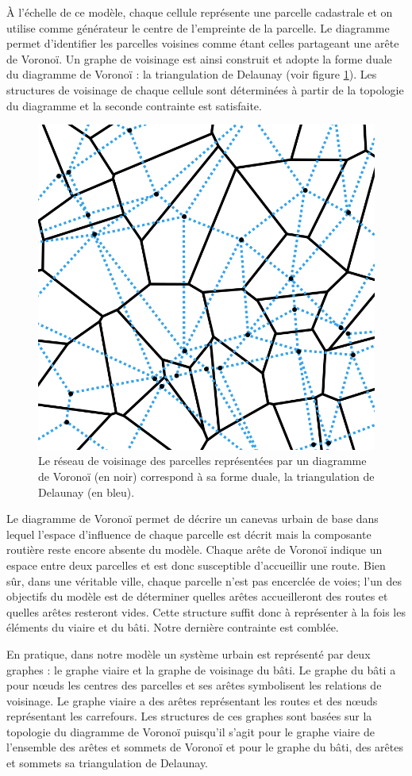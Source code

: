 \documentclass[10pt]{article}
\begin{document}
À l'échelle de ce modèle, chaque cellule représente une parcelle
cadastrale et on utilise comme générateur le centre de l'empreinte de
la parcelle. Le diagramme permet d'identifier les parcelles voisines
comme étant celles partageant une arête de Voronoï. Un graphe de
voisinage est ainsi construit et adopte la forme duale du diagramme de
Voronoï : la triangulation de Delaunay (voir figure
\ref{fig:delaunay}). Les structures de voisinage de chaque cellule
sont déterminées à partir de la topologie du diagramme et la seconde
contrainte est satisfaite.

\begin{figure}[!ht]
  \centering
  \includegraphics[width=.7\linewidth]{images/delaunay.png}
  \caption{Le réseau de voisinage des parcelles représentées par un
    diagramme de Voronoï (en noir) correspond à sa forme duale, la
    triangulation de Delaunay (en bleu).}
  \label{fig:delaunay}
\end{figure}

Le diagramme de Voronoï permet de décrire un canevas urbain de base
dans lequel l'espace d'influence de chaque parcelle est décrit mais la
composante routière reste encore absente du modèle. Chaque arête de
Voronoï indique un espace entre deux parcelles et est donc susceptible
d'accueillir une route. Bien sûr, dans une véritable ville, chaque
parcelle n'est pas encerclée de voies; l'un des objectifs du modèle
est de déterminer quelles arêtes accueilleront des routes et quelles
arêtes resteront vides. Cette structure suffit donc à représenter à la
fois les éléments du viaire et du bâti. Notre dernière contrainte est
comblée.

En pratique, dans notre modèle un système urbain est représenté par
deux graphes : le graphe viaire et la graphe de voisinage du bâti. Le
graphe du bâti a pour n\oe uds les centres des parcelles et ses arêtes
symbolisent les relations de voisinage. Le graphe viaire a des arêtes
représentant les routes et des n\oe uds représentant les
carrefours. Les structures de ces graphes sont basées sur la topologie
du diagramme de Voronoï puisqu'il s'agit pour le graphe viaire de
l'ensemble des arêtes et sommets de Voronoï et pour le graphe du bâti,
des arêtes et sommets sa triangulation de Delaunay.
\end{document}
